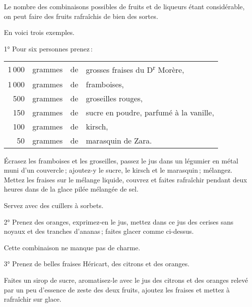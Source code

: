 Le nombre des combinaisons possibles de fruits et de liqueurs étant
considérable, on peut faire des fruits rafraîchis de bien des sortes.

\medskip

En voici trois exemples.

\medskip

1° Pour six personnes prenez :

\footnotesize
\begin{longtable}{rrrp{16em}}
  1 000 & grammes & de & grosses fraises du D\textsuperscript{r} Morère,                                  \\
  1 000 & grammes & de & framboises,                                                                      \\
    500 & grammes & de & groseilles rouges,                                                               \\
    150 & grammes & de & sucre en poudre, parfumé à la vanille,                                           \\
    100 & grammes & de & kirsch,                                                                          \\
     50 & grammes & de & marasquin de Zara.                                                               \\
\end{longtable}
\normalsize

Écrasez les framboises et les groseilles, passez le jus dans un légumier en
métal muni d'un couvercle ; ajoutez-y le sucre, le kirsch et le marasquin ;
mélangez. Mettez les fraises sur le mélange liquide, couvrez et faites
rafraîchir pendant deux heures dans de la glace pilée mélangée de sel.

Servez avec des cuillers à sorbets.

\medskip

2° Prenez des oranges, exprimez-en le jus, mettez dans ce jus des cerises sans
noyaux et des tranches d'ananas ; faites glacer comme ci-dessus.

Cette combinaison ne manque pas de charme.

\medskip

3° Prenez de belles fraises Héricart, des citrons et des oranges.

Faites un sirop de sucre, aromatisez-le avec le jus des citrons et des oranges
relevé par un peu d'essence de zeste des deux fruits, ajoutez les fraises et
mettez à rafraîchir sur glace.

